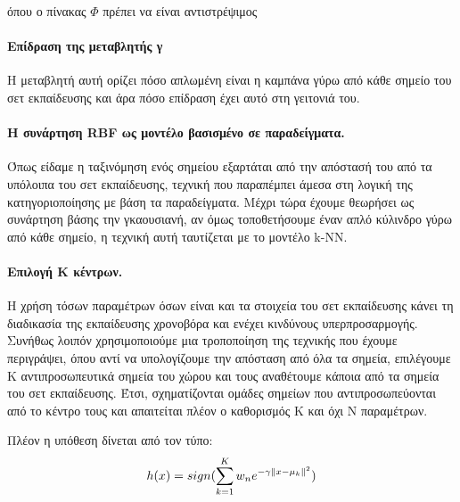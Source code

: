 όπου ο πίνακας $\Phi$ πρέπει να είναι αντιστρέψιμος

\paragraph{Επίδραση της μεταβλητής γ} Η μεταβλητή αυτή ορίζει πόσο απλωμένη είναι η καμπάνα γύρω από κάθε σημείο του σετ εκπαίδευσης και άρα πόσο επίδραση έχει αυτό στη γειτονιά του.

\paragraph{H συνάρτηση RBF ως μοντέλο βασισμένο σε παραδείγματα.} Όπως είδαμε η ταξινόμηση ενός σημείου εξαρτάται από την απόστασή του από τα υπόλοιπα του σετ εκπαίδευσης, τεχνική που παραπέμπει άμεσα στη λογική της κατηγοριοποίησης με βάση τα παραδείγματα. Μέχρι τώρα έχουμε θεωρήσει ως συνάρτηση βάσης την γκαουσιανή, αν όμως τοποθετήσουμε έναν απλό κύλινδρο γύρω από κάθε σημείο, η τεχνική αυτή ταυτίζεται με το μοντέλο k-NN.
\paragraph{Επιλογή Κ κέντρων.} Η χρήση τόσων παραμέτρων όσων είναι και τα στοιχεία του σετ εκπαίδευσης κάνει τη διαδικασία της εκπαίδευσης χρονοβόρα και ενέχει κινδύνους υπερπροσαρμογής. Συνήθως λοιπόν χρησιμοποιούμε μια τροποποίηση της τεχνικής που έχουμε περιγράψει, όπου αντί να υπολογίζουμε την απόσταση από όλα τα σημεία, επιλέγουμε Κ αντιπροσωπευτικά σημεία του χώρου και τους αναθέτουμε κάποια από τα σημεία του σετ εκπαίδευσης. Έτσι, σχηματίζονται ομάδες σημείων που αντιπροσωπεύονται από το κέντρο τους και απαιτείται πλέον ο καθορισμός Κ και όχι Ν παραμέτρων.

Πλέον η υπόθεση δίνεται από τον τύπο:
\begin{equation}
h(x)= sign( \sum_{k=1}^{K} w_n e^{-\gamma \left\lVert x - \mu_k\right\rVert^2})
\end{equation}

